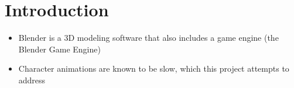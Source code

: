 \section{Introduction}
\begin{itemize}
 \item Blender is a 3D modeling software that also includes a game engine (the Blender Game Engine)
 \item Character animations are known to be slow, which this project attempts to address
\end{itemize}
